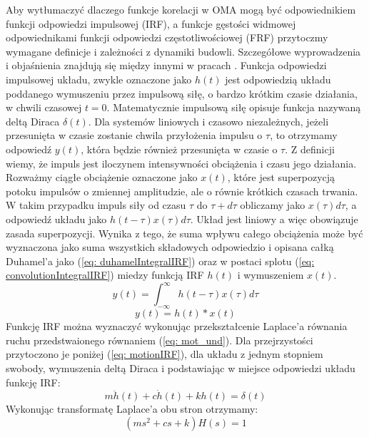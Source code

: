 Aby wytłumaczyć dlaczego funkcje korelacji w OMA mogą być odpowiednikiem funkcji odpowiedzi impulsowej (IRF), a funkcje gęstości widmowej odpowiednikami funkcji odpowiedzi częstotliwościowej (FRF) przytoczmy wymagane definicje i zależności z dynamiki budowli. Szczegółowe wyprowadzenia i objaśnienia znajdują się między innymi w pracach \parencite{Brincker2015,Rainieri2014,Chopra2012a,Ewins2000}. Funkcja odpowiedzi impulsowej układu, zwykle oznaczone jako $h(t)$ jest odpowiedzią układu poddanego wymuszeniu przez impulsową siłę, o bardzo krótkim czasie działania, w chwili czasowej $t=0$. Matematycznie impulsową siłę opisuje funkcja nazywaną deltą Diraca $\delta(t)$. Dla systemów liniowych i czasowo niezależnych, jeżeli przesunięta w czasie zostanie chwila przyłożenia impulsu o $\tau$, to otrzymamy odpowiedź $y(t)$, która będzie również przesunięta w czasie o $\tau$. Z definicji wiemy, że impuls jest iloczynem intensywności obciążenia i czasu jego działania. Rozważmy ciągłe obciążenie oznaczone jako $x(t)$, które jest superpozycją potoku impulsów o zmiennej amplitudzie, ale o równie krótkich czasach trwania. W takim przypadku impuls siły od czasu $\tau$ do $\tau+d\tau$ obliczamy jako $x(\tau)d\tau$, a odpowiedź układu jako $h(t-\tau)x(\tau)d\tau$. Układ jest liniowy a więc obowiązuje zasada superpozycji. Wynika z tego, że suma wpływu całego obciążenia może być wyznaczona jako suma wszystkich składowych odpowiedzio i opisana całką Duhamel'a jako (\ref{eq: duhamelIntegralIRF}) oraz w postaci splotu (\ref{eq: convolutionIntegralIRF}) miedzy funkcją IRF $h(t)$ i wymuszeniem $x(t)$.
\begin{equation} \label{eq: duhamelIntegralIRF}
	y(t)=\int_{-\infty}^{\infty} h(t-\tau)x(\tau)d\tau
\end{equation}
\begin{equation} \label{eq: convolutionIntegralIRF}
	y(t)=h(t)*x(t)
\end{equation}
Funkcję IRF można wyznaczyć wykonując przekształcenie Laplace'a równania ruchu przedstwaionego równaniem (\ref{eq: mot_und}). Dla przejrzystości przytoczono je poniżej (\ref{eq: motionIRF}), dla układu z jednym stopniem swobody, wymuszenia deltą Diraca i podstawiając w miejsce odpowiedzi układu funkcję IRF:
\begin{equation} \label{eq: motionIRF}
	m\ddot{h}(t)+c\dot{h}(t)+kh(t)=\delta(t)
\end{equation}
Wykonując transformatę Laplace'a obu stron otrzymamy:
\begin{equation} \label{eq: laplaceTransofrmMOVEQ}
	(ms^2+cs+k)H(s)=1
\end{equation}
